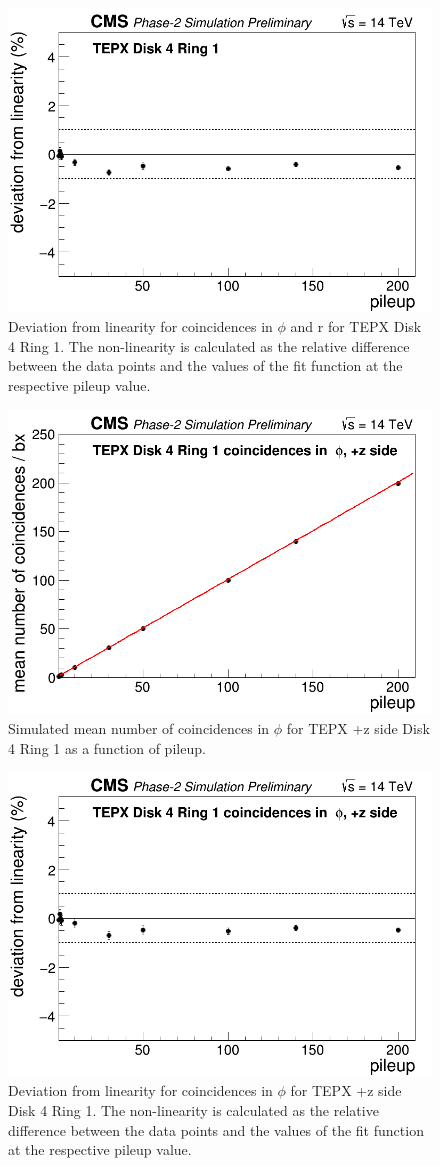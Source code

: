 \begin{figure}[H]
  \centering
  \includegraphics[width=0.5\columnwidth]{./TEPX_Disk_4_Ring_1_mean_number_of_coincidences___bx_Linearity_residuals.png}
  \caption{Deviation from linearity for coincidences in $\phi$ and r for TEPX Disk 4 Ring 1. The non-linearity is calculated as the
relative difference between the data points and the values of the fit function at the respective pileup value.}
  \label{fig:CMS}
\end{figure}


\begin{figure}[H]
  \centering
  \includegraphics[width=0.5\columnwidth]{./TEPX_Disk_4_Ring_1_coincidences_in_phi__pz_side_mean_number_of_coincidences___bx_Linearity.png}
  \caption{Simulated mean number of coincidences in $\phi$ for TEPX +z side Disk 4 Ring 1 as a function of pileup.}
  \label{fig:CMS}
\end{figure}


\begin{figure}[H]
  \centering
  \includegraphics[width=0.5\columnwidth]{./TEPX_Disk_4_Ring_1_coincidences_in_phi__pz_side_mean_number_of_coincidences___bx_Linearity_residuals.png}
  \caption{Deviation from linearity for coincidences in $\phi$ for TEPX +z side Disk 4 Ring 1. The non-linearity is calculated as the relative difference between the data points and the values of the fit function at the respective pileup value.}
  \label{fig:CMS}
\end{figure}



